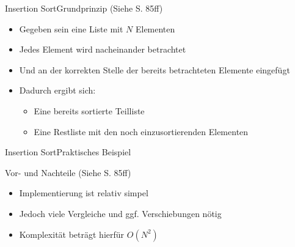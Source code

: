 \begin{frame}{Insertion Sort}{Grundprinzip (Siehe \cite{ottmann2017} S. 85ff)}
    \begin{itemize}
        \item Gegeben sein eine Liste mit $N$ Elementen
        \item Jedes Element wird nacheinander betrachtet
        \item Und an der korrekten Stelle der bereits betrachteten Elemente eingefügt
        \item Dadurch ergibt sich:
        \begin{itemize}
            \item Eine bereits sortierte Teilliste
            \item Eine Restliste mit den noch einzusortierenden Elementen
        \end{itemize}
    \end{itemize}
\end{frame}

\begin{frame}{Insertion Sort}{Praktisches Beispiel}
\end{frame}

\begin{frame}{Vor- und Nachteile (Siehe \cite{ottmann2017} S. 85ff)}
    \begin{itemize}
        \item Implementierung ist relativ simpel
        \item Jedoch viele Vergleiche und ggf. Verschiebungen nötig
        \item Komplexität beträgt hierfür $O(N^2)$
    \end{itemize}
\end{frame}

